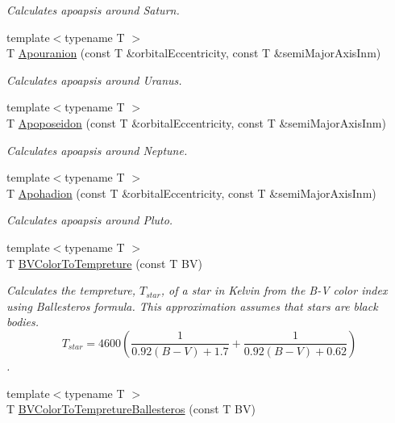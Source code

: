 \begin{DoxyCompactItemize}
\begin{DoxyCompactList}\small\item\em Calculates apoapsis around Saturn. \end{DoxyCompactList}\item 
{\footnotesize template$<$typename T $>$ }\\T \mbox{\hyperlink{group___e_g_x_phys-_apoapsis_gae6f96c6d840188839132e0ef94ce0711}{Apouranion}} (const T \&orbital\+Eccentricity, const T \&semi\+Major\+Axis\+Inm)
\begin{DoxyCompactList}\small\item\em Calculates apoapsis around Uranus. \end{DoxyCompactList}\item 
{\footnotesize template$<$typename T $>$ }\\T \mbox{\hyperlink{group___e_g_x_phys-_apoapsis_ga985afde0717360cffc6b5c17c9a42ac8}{Apoposeidon}} (const T \&orbital\+Eccentricity, const T \&semi\+Major\+Axis\+Inm)
\begin{DoxyCompactList}\small\item\em Calculates apoapsis around Neptune. \end{DoxyCompactList}\item 
{\footnotesize template$<$typename T $>$ }\\T \mbox{\hyperlink{group___e_g_x_phys-_apoapsis_ga9e2578ab880b46f0736936608710f4ad}{Apohadion}} (const T \&orbital\+Eccentricity, const T \&semi\+Major\+Axis\+Inm)
\begin{DoxyCompactList}\small\item\em Calculates apoapsis around Pluto. \end{DoxyCompactList}\item 
{\footnotesize template$<$typename T $>$ }\\T \mbox{\hyperlink{group___e_g_x_phys-_astrophysic-_b-_v_color_gad251a8c25285f5817e307c35c3ec971a}{B\+V\+Color\+To\+Tempreture}} (const T BV)
\begin{DoxyCompactList}\small\item\em Calculates the tempreture, $T_{star}$, of a star in Kelvin from the B-\/V color index using Ballesteros\textquotesingle{} formula. This approximation assumes that stars are black bodies. \[T_{star}=4600 \left ( \frac{1}{0.92 (B-V)+ 1.7} + \frac{1}{0.92 (B-V) + 0.62} \right )\]. \end{DoxyCompactList}\item 
{\footnotesize template$<$typename T $>$ }\\T \mbox{\hyperlink{group___e_g_x_phys-_astrophysic-_b-_v_color_ga0e553143a3bb121c3ae50ca96c502140}{B\+V\+Color\+To\+Tempreture\+Ballesteros}} (const T BV)

\end{DoxyCompactItemize}
